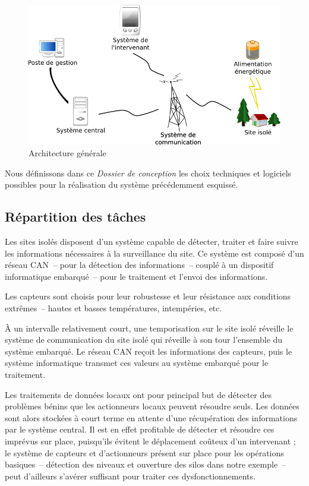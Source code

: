 \documentclass[a4paper, 11pt, final]{article}
\begin{document}
\begin{figure}[!htp]
\begin{center}
\includegraphics[width=.7\textwidth]{schema_architecture_generale.png}
\caption{Architecture générale}
\label{figure:schema_architecture_generale}
\end{center}
\end{figure}

Nous définissons dans ce \emph{Dossier de conception} les choix
techniques et logiciels possibles pour la réalisation du système
précédemment esquissé.

\subsection{Répartition des tâches}
Les sites isolés disposent d'un système capable de détecter, traiter
et faire suivre les informations nécessaires à la surveillance du
site. Ce système est composé d'un réseau CAN~-- pour la détection des
informations~-- couplé à un dispositif informatique embarqué~-- pour
le traitement et l'envoi des informations.

Les capteurs sont choisis pour leur robustesse et leur résistance aux
conditions extrêmes~-- hautes et basses températures, intempéries,
etc.

À un intervalle relativement court, une temporisation sur le site
isolé réveille le système de communication du site isolé qui
réveille à son tour l'ensemble du système embarqué. Le réseau CAN
reçoit les informations des capteurs, puis le système informatique
transmet ces valeurs au système embarqué pour le traitement.

Les traitements de données locaux ont pour principal but de détecter
des problèmes bénins que les actionneurs locaux peuvent résoudre
seuls. Les données sont alors stockées à court terme en attente d'une
récupération des informations par le système central. Il est en effet
profitable de détecter et résoudre ces imprévus sur place, puisqu'ils
évitent le déplacement coûteux d'un intervenant ; le système de
capteurs et d'actionneurs présent sur place pour les opérations
basiques~-- détection des niveaux et ouverture des silos dans notre
exemple~-- peut d'ailleurs s'avérer suffisant pour traiter ces
dysfonctionnements.
\end{document}
